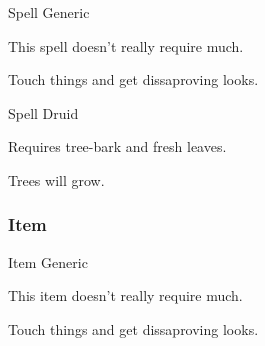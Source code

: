 \documentclass[10pt,twoside,twocolumn]{article}
\begin{document}
\begin{spellbox}{Spell Generic}
    \spelldetails[]
    \begin{spellaction}[Materials]
    This spell doesn't really require much.
    \end{spellaction}

    \begin{spellaction}[Effect]
    Touch things and get dissaproving looks.
    \end{spellaction}
\end{spellbox}

\begin{spellbox}{Spell Druid}
    \spelldetails[%
    level   = 9,
    school  = Transmutation,
    time    = 1 action,
    range   = Touch,
    duration = Instant,
    components = {S,M},
    restrict = Druid,
    ritual = yes
    ]
    \begin{spellaction}[Materials]
    Requires tree-bark and fresh leaves.
    \end{spellaction}

    \begin{spellaction}[Effect]
    Trees will grow.
    \end{spellaction}
\end{spellbox}

\subsubsection{Item}

\begin{itembox}{Item Generic}
    \itemdetails[]
    \begin{itemaction}[Materials]
    This item doesn't really require much.
    \end{itemaction}

    \begin{itemaction}[Effect]
    Touch things and get dissaproving looks.
    \end{itemaction}
\end{itembox}

\end{document}
